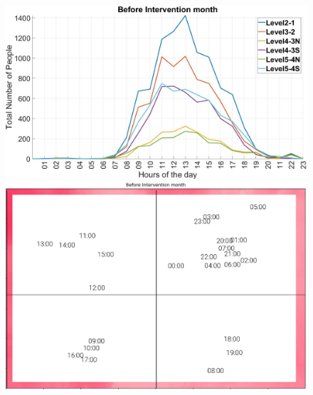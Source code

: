 \begin{figure}[htb]
\centering
    \begin{minipage}[b]{0.5\textwidth}
    \includegraphics[width=\textwidth]{image/before_int.jpg}%
    \end{minipage}
    \begin{minipage}[b]{0.39\textwidth}
    \includegraphics[width=\textwidth]{image/Chapters/Chapter6/timeseriesBefore.png}
    \end{minipage}
    

\end{figure}
